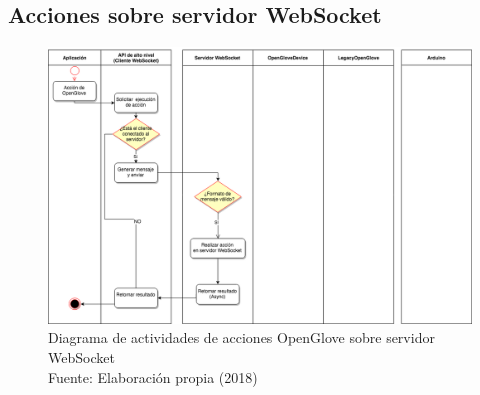\subsection{Acciones sobre servidor WebSocket}
\begin{figure}[H]
  \begin{center} 
   	\includegraphics[width=1.0\textwidth]{images/chapter04/ActivityDiagrams-OpenGloveActions-1.png} 
   	\captionsetup{justification=centering}
    \caption[Diagrama de actividades de las acciones OpenGlove sobre servidor WebSocket]{Diagrama de actividades de acciones OpenGlove sobre servidor WebSocket\\Fuente: Elaboración propia (2018)}
    \label{fig:activity-diagrams-1-websocket-server}
  \end{center}
\end{figure}


